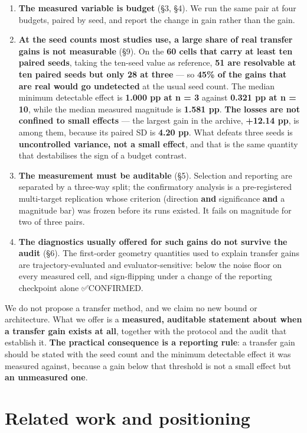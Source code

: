 \documentclass[pdflatex,sn-mathphys-ay]{sn-jnl}
\begin{document}
\begin{enumerate}
\item \textbf{The measured variable is budget} (\S{}3, \S{}4). We run the same pair at four budgets, paired by seed, and report the change in gain rather than the gain.
\item \textbf{At the seed counts most studies use, a large share of real transfer gains is not measurable} (\S{}9). On the \textbf{60 cells that carry at least ten paired seeds}, taking the ten-seed value as reference, \textbf{51 are resolvable at ten paired seeds but only 28 at three} --- so \textbf{45\% of the gains that are real would go undetected} at the usual seed count. The median minimum detectable effect is \textbf{1.000 pp at n = 3} against \textbf{0.321 pp at n = 10}, while the median measured magnitude is \textbf{1.581 pp}. \textbf{The losses are not confined to small effects} --- the largest gain in the archive, \textbf{+12.14 pp}, is among them, because its paired SD is \textbf{4.20 pp}. What defeats three seeds is \textbf{uncontrolled variance, not a small effect}, and that is the same quantity that destabilises the sign of a budget contrast.
\item \textbf{The measurement must be auditable} (\S{}5). Selection and reporting are separated by a three-way split; the confirmatory analysis is a pre-registered multi-target replication whose criterion (direction \textbf{and} significance \textbf{and} a magnitude bar) was frozen before its runs existed. It fails on magnitude for two of three pairs.
\item \textbf{The diagnostics usually offered for such gains do not survive the audit} (\S{}6). The first-order geometry quantities used to explain transfer gains are trajectory-evaluated and evaluator-sensitive: below the noise floor on every measured cell, and sign-flipping under a change of the reporting checkpoint alone ✅CONFIRMED.
\end{enumerate}

We do not propose a transfer method, and we claim no new bound or architecture. What we offer is a \textbf{measured, auditable statement about when a transfer gain exists at all}, together with the protocol and the audit that establish it. \textbf{The practical consequence is a reporting rule}: a transfer gain should be stated with the seed count and the minimum detectable effect it was measured against, because a gain below that threshold is not a small effect but \textbf{an unmeasured one}.

\section{Related work and positioning}%
\end{document}
